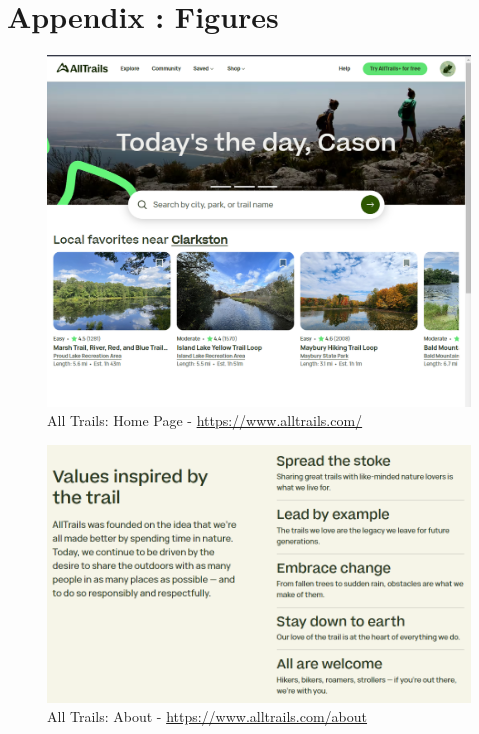 \documentclass[12pt]{article}
\begin{document}
\newpage

\section{Appendix : Figures}

\begin{figure}[ht!]
    \centering
    \includegraphics[width=\textwidth]{./AT_Home.PNG}
    \caption{All Trails: Home Page - \url{https://www.alltrails.com/}}
    \label{fig:AT_Home}
\end{figure}

\begin{figure}[ht!]
    \centering
    \includegraphics[width=\textwidth]{./AT_Values.PNG}
    \caption{All Trails: About - \url{https://www.alltrails.com/about}}
    \label{fig:AT_Values}
\end{figure}
\end{document}
